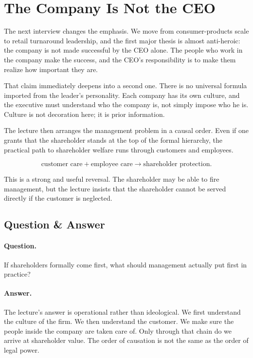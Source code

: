 \section{The Company Is Not the CEO}

The next interview changes the emphasis. We move from consumer-products scale to retail turnaround leadership, and the first major thesis is almost anti-heroic: the company is not made successful by the CEO alone. The people who work in the company make the success, and the CEO's responsibility is to make them realize how important they are.

That claim immediately deepens into a second one. There is no universal formula imported from the leader's personality. Each company has its own culture, and the executive must understand who the company is, not simply impose who he is. Culture is not decoration here; it is prior information.

The lecture then arranges the management problem in a causal order. Even if one grants that the shareholder stands at the top of the formal hierarchy, the practical path to shareholder welfare runs through customers and employees.

\begin{equation}
\text{customer care} + \text{employee care}
\longrightarrow
\text{shareholder protection}.
\end{equation}

This is a strong and useful reversal. The shareholder may be able to fire management, but the lecture insists that the shareholder cannot be served directly if the customer is neglected.

\subsection{Question \& Answer}

\paragraph{Question.} If shareholders formally come first, what should management actually put first in practice?

\paragraph{Answer.} The lecture's answer is operational rather than ideological. We first understand the culture of the firm. We then understand the customer. We make sure the people inside the company are taken care of. Only through that chain do we arrive at shareholder value. The order of causation is not the same as the order of legal power.

